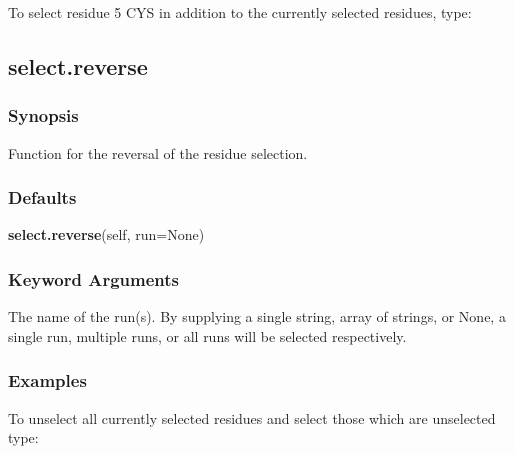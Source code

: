  To select residue 5 CYS in addition to the currently selected residues, type: 
  






  

 \newpage 

 \subsection{select.reverse} 

  
 \subsubsection{Synopsis} 

 Function for the reversal of the residue selection. 
  

  
 \subsubsection{Defaults} 

 \textsf{\textbf{select.reverse}(self, run=None)} 

  
 \subsubsection{Keyword Arguments} 

   The name of the run(s).  By supplying a single string, array of strings, or None, a single run, multiple runs, or all runs will be selected respectively.  

  

  
 \subsubsection{Examples} 

 To unselect all currently selected residues and select those which are unselected type: 
  


  

 \newpage 

